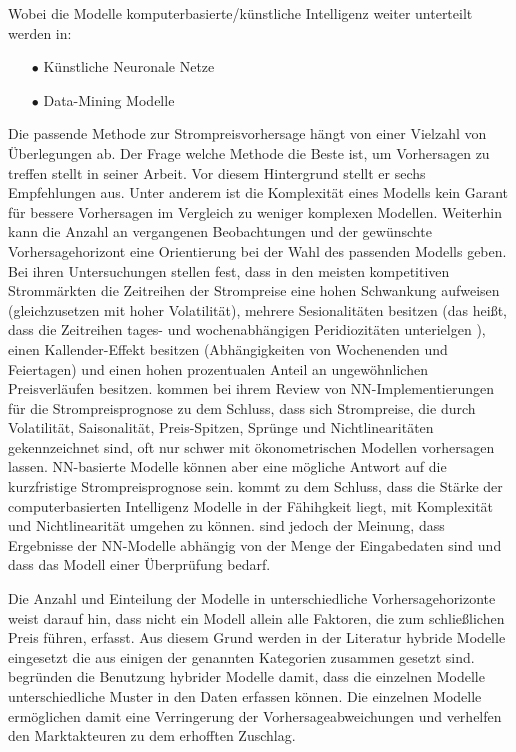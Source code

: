 Wobei die Modelle komputerbasierte/künstliche Intelligenz weiter unterteilt werden in: 
\begin{itemize}
\item[\textbf{$\bullet$}]%
Künstliche Neuronale Netze

\item[\textbf{$\bullet$}]%
Data-Mining Modelle
\end{itemize}


Die passende Methode zur Strompreisvorhersage hängt von einer Vielzahl von Überlegungen ab. Der Frage welche Methode die Beste ist, um Vorhersagen zu treffen stellt \citet{Chatfield1988} in seiner Arbeit. Vor diesem Hintergrund stellt er sechs Empfehlungen aus. Unter anderem ist die Komplexität eines Modells kein Garant für bessere Vorhersagen im Vergleich zu weniger komplexen Modellen. Weiterhin kann die Anzahl an vergangenen Beobachtungen und der gewünschte Vorhersagehorizont eine Orientierung bei der Wahl des passenden Modells geben.
Bei ihren Untersuchungen stellen \citet{Nogales2002} fest, dass in den meisten kompetitiven Strommärkten die Zeitreihen der Strompreise eine hohen Schwankung aufweisen (gleichzusetzen mit hoher Volatilität), mehrere Sesionalitäten besitzen (das heißt, dass die Zeitreihen tages- und wochenabhängigen Peridiozitäten unterielgen ), einen Kallender-Effekt besitzen (Abhängigkeiten von Wochenenden und Feiertagen) und einen hohen prozentualen Anteil an ungewöhnlichen Preisverläufen besitzen. \citet{Vijayalakshmi2015} kommen bei ihrem Review von NN-Implementierungen für die Strompreisprognose zu dem Schluss, dass sich Strompreise, die durch Volatilität, Saisonalität, Preis-Spitzen, Sprünge und Nichtlinearitäten gekennzeichnet sind, oft nur schwer mit ökonometrischen Modellen vorhersagen lassen. NN-basierte Modelle können aber eine mögliche Antwort auf die kurzfristige Strompreisprognose sein. \citet{Weron2014} kommt zu dem Schluss, dass die Stärke der computerbasierten Intelligenz Modelle in der Fähihgkeit liegt, mit Komplexität und Nichtlinearität umgehen zu können. \citet{Gareta2006} sind jedoch der Meinung, dass Ergebnisse der NN-Modelle abhängig von der Menge der Eingabedaten sind und dass das Modell einer Überprüfung bedarf.

Die Anzahl und Einteilung der Modelle in unterschiedliche Vorhersagehorizonte weist darauf hin, dass nicht ein Modell allein alle Faktoren, die zum schließlichen Preis führen, erfasst. Aus diesem Grund werden in der Literatur hybride Modelle eingesetzt die aus einigen der genannten Kategorien zusammen gesetzt sind. \citet{Cerjan2013} begründen die Benutzung hybrider Modelle damit, dass die einzelnen Modelle unterschiedliche Muster in den Daten erfassen können. Die einzelnen Modelle ermöglichen damit eine Verringerung der Vorhersageabweichungen und verhelfen den Marktakteuren zu dem erhofften Zuschlag.


